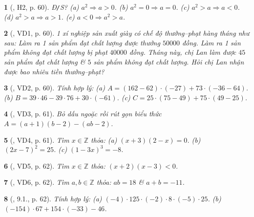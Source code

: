 \documentclass{article}
\newtheorem{baitoan}{}
\begin{document}
\begin{baitoan}[\cite{Binh_boi_duong_Toan_6_tap_1}, H2, p. 60]
	{\rm Đ{\tt/}S?} (a) $a^2\Rightarrow a > 0$. (b) $a^2 = 0\Rightarrow a = 0$. (c) $a^2 > a\Rightarrow a < 0$. (d) $a^2 > a\Rightarrow a > 1$. (e) $a < 0\Rightarrow a^2 > a$.
\end{baitoan}

\begin{baitoan}[\cite{Binh_boi_duong_Toan_6_tap_1}, VD1, p. 60]
	1 xí nghiệp sản xuất giày có chế độ thưởng--phạt hàng tháng như sau: Làm ra 1 sản phẩm đạt chất lượng được thưởng $50000$ đồng. Làm ra 1 sản phẩm không đạt chất lượng bị phạt $40000$ đồng. Tháng này, chị Lan làm được $45$ sản phẩm đạt chất lượng \& $5$ sản phẩm không đạt chất lượng. Hỏi chị Lan nhận được bao nhiêu tiền thưởng--phạt?
\end{baitoan}

\begin{baitoan}[\cite{Binh_boi_duong_Toan_6_tap_1}, VD2, p. 60]
	Tính hợp lý: (a) $A = (162 - 62)\cdot(-27) + 73\cdot(-36 - 64)$. (b) $B = 39\cdot46 - 39\cdot76 + 30\cdot(-61)$. (c) $C = 25\cdot(75 - 49) + 75\cdot(49 - 25)$.
\end{baitoan}

\begin{baitoan}[\cite{Binh_boi_duong_Toan_6_tap_1}, VD3, p. 61]
	Bỏ dấu ngoặc rồi rút gọn biểu thức $A = (a + 1)(b - 2) - (ab - 2)$.
\end{baitoan}

\begin{baitoan}[\cite{Binh_boi_duong_Toan_6_tap_1}, VD4, p. 61]
	Tìm $x\in\mathbb{Z}$ thỏa: (a) $(x + 3)(2 - x) = 0$. (b) $(2x - 7)^2 = 25$. (c) $(1 - 3x)^3 = -8$.
\end{baitoan}

\begin{baitoan}[\cite{Binh_boi_duong_Toan_6_tap_1}, VD5, p. 62]
	Tìm $x\in\mathbb{Z}$ thỏa: $(x + 2)(x - 3) < 0$.
\end{baitoan}

\begin{baitoan}[\cite{Binh_boi_duong_Toan_6_tap_1}, VD6, p. 62]
	Tìm $a,b\in\mathbb{Z}$ thỏa: $ab = 18$ \& $a + b = -11$.
\end{baitoan}

\begin{baitoan}[\cite{Binh_boi_duong_Toan_6_tap_1}, 9.1., p. 62]
	Tính hợp lý: (a) $(-4)\cdot125\cdot(-2)\cdot8\cdot(-5)\cdot25$. (b) $(-154)\cdot67 + 154\cdot(-33) - 46$.
\end{baitoan}
\end{document}
